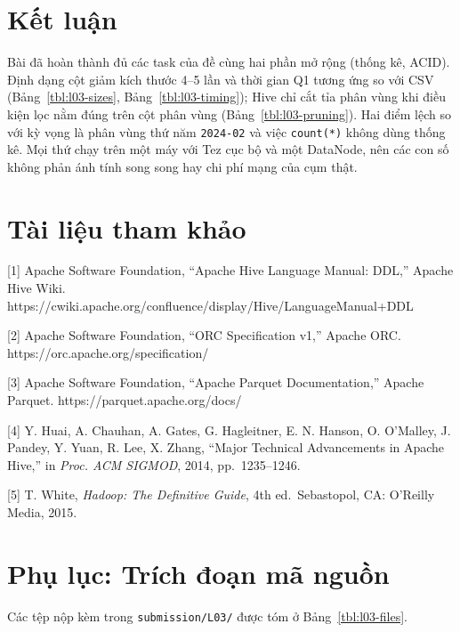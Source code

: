 \documentclass[
  12pt,
  a4paper,
]{article}
\begin{document}
\section{Kết luận}\label{sec:l03-conclusion}

Bài đã hoàn thành đủ các task của đề cùng hai phần mở rộng (thống kê,
ACID). Định dạng cột giảm kích thước 4--5 lần và thời gian Q1 tương ứng
so với CSV (Bảng~\ref{tbl:l03-sizes}, Bảng~\ref{tbl:l03-timing}); Hive
chỉ cắt tỉa phân vùng khi điều kiện lọc nằm đúng trên cột phân vùng
(Bảng~\ref{tbl:l03-pruning}). Hai điểm lệch so với kỳ vọng là phân vùng
thứ năm \texttt{2024-02} và việc \texttt{count(*)} không dùng thống kê.
Mọi thứ chạy trên một máy với Tez cục bộ và một DataNode, nên các con số
không phản ánh tính song song hay chi phí mạng của cụm thật.

\section*{Tài liệu tham khảo}\label{tuxe0i-liux1ec7u-tham-khux1ea3o}

{[}1{]} Apache Software Foundation, ``Apache Hive Language Manual:
DDL,'' Apache Hive Wiki.
https://cwiki.apache.org/confluence/display/Hive/LanguageManual+DDL

{[}2{]} Apache Software Foundation, ``ORC Specification v1,'' Apache
ORC. https://orc.apache.org/specification/

{[}3{]} Apache Software Foundation, ``Apache Parquet Documentation,''
Apache Parquet. https://parquet.apache.org/docs/

{[}4{]} Y. Huai, A. Chauhan, A. Gates, G. Hagleitner, E. N. Hanson, O.
O'Malley, J. Pandey, Y. Yuan, R. Lee, X. Zhang, ``Major Technical
Advancements in Apache Hive,'' in \emph{Proc. ACM SIGMOD}, 2014,
pp.~1235--1246.

{[}5{]} T. White, \emph{Hadoop: The Definitive Guide}, 4th
ed.~Sebastopol, CA: O'Reilly Media, 2015.

\section*{Phụ lục: Trích đoạn mã
nguồn}\label{phux1ee5-lux1ee5c-truxedch-ux111oux1ea1n-muxe3-nguux1ed3n}

Các tệp nộp kèm trong \texttt{submission/L03/} được tóm ở
Bảng~\ref{tbl:l03-files}.
\end{document}
